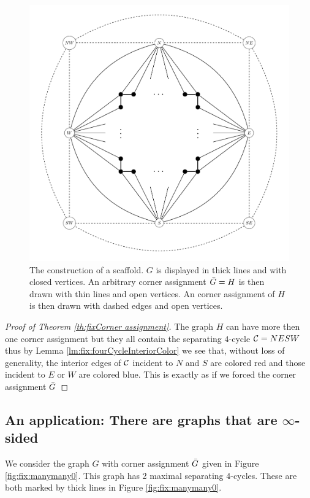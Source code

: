   \begin{figure}[h!]
  \centering
  \includegraphics[scale=0.5]{fixExtension/img/scafold}

  \caption{The construction of a scaffold. $G$ is displayed in thick lines and with closed vertices. An arbitrary corner assignment $\bar{G} =H$ is then drawn with thin lines and open vertices. An corner assignment of $H$ is then drawn with dashed edges and open vertices.
      \label{fig:scafold}}
  \end{figure}

  \begin{proof}[Proof of Theorem \ref{th:fixCorner assignment}]
    The graph $H$ can have more then one corner assignment but they all contain the separating $4$-cycle $\mathcal{C}= NESW$ thus by Lemma \ref{lm:fix:fourCycleInteriorColor} we see that, without loss of generality, the interior edges of $\mathcal{C}$ incident to $N$ and $S$ are colored red and those incident to $E$ or $W$ are colored blue. This is exactly as if we forced the corner assignment $\bar{G}$
    \end{proof}

\subsection{An application: There are graphs that are $\infty$-sided}
  \label{ss:fix:manymany}
  We consider the graph $G$ with corner assignment $\bar{G}$ given in Figure \ref{fig:fix:manymany0}. This graph has 2 maximal separating $4$-cycles. These are both marked by thick lines in Figure \ref{fig:fix:manymany0}.

